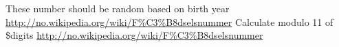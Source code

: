 
\begin{DoxyRefList}
\item[Global \mbox{\hyperlink{class_faker_1_1_provider_1_1no___n_o_1_1_person_a30dd304b5e65242e0c01023eeb53fc19}{Person\+::personal\+Identity\+Number}} (\textbackslash{}\mbox{\hyperlink{class_faker_1_1_provider_1_1_date_time}{Date\+Time}} \$birthdate=null, \$gender=null)]\label{todo__todo000003}%
%
These number should be random based on birth year \mbox{\hyperlink{}{http\+://no.\+wikipedia.\+org/wiki/\+F\%\+C3\%\+B8dselsnummer}} \label{todo__todo000004}%
%
Calculate modulo 11 of \$digits \mbox{\hyperlink{}{http\+://no.\+wikipedia.\+org/wiki/\+F\%\+C3\%\+B8dselsnummer}}
\end{DoxyRefList}